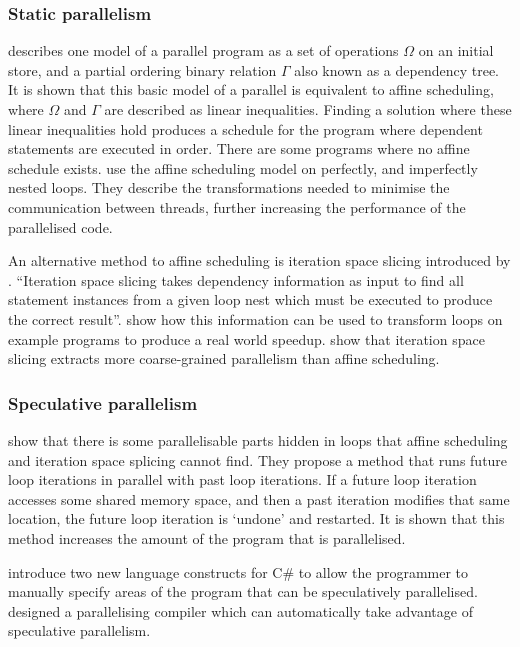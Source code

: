 \subsubsection{Static parallelism}
\textcite{Feautrier1992} describes one model of a parallel program as a set of operations $\Omega$ on an initial store, and a partial ordering binary relation $\Gamma$ also known as a dependency tree. It is shown that this basic model of a parallel is equivalent to affine scheduling, where $\Omega$ and $\Gamma$ are described as linear inequalities. Finding a solution where these linear inequalities hold produces a schedule for the program where dependent statements are executed in order. There are some programs where no affine schedule exists.
\textcite{Bondhugula2008} use the affine scheduling model on perfectly, and imperfectly nested loops. They describe the transformations needed to minimise the communication between threads, further increasing the performance of the parallelised code.

An alternative method to affine scheduling is iteration space slicing introduced by \textcite{Pugh1997}. ``Iteration space slicing takes dependency information as input to find all statement instances from a given loop nest which must be executed to produce the correct result''. \textcite{Pugh1997} show how this information can be used to transform loops on example programs to produce a real world speedup. \textcite{Beletska2011} show that iteration space slicing extracts more coarse-grained parallelism than affine scheduling.

\subsubsection{Speculative parallelism}
\textcite{Zhong2008} show that there is some parallelisable parts hidden in loops that affine scheduling and iteration space splicing cannot find. They propose a method that runs future loop iterations in parallel with past loop iterations. If a future loop iteration accesses some shared memory space, and then a past iteration modifies that same location, the future loop iteration is `undone' and restarted. It is shown that this method increases the amount of the program that is parallelised.

\textcite{Prabhu2010} introduce two new language constructs for C\# to allow the programmer to manually specify areas of the program that can be speculatively parallelised. \textcite{Yiapanis2015} designed a parallelising compiler which can automatically take advantage of speculative parallelism.

